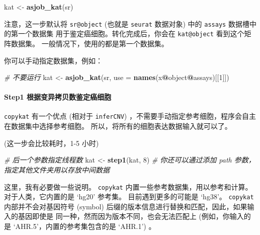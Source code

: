 \documentclass[
]{article}
\newenvironment{Shaded}{\begin{snugshade}}{\end{snugshade}}
\newcommand{\CommentTok}[1]{\textcolor[rgb]{0.56,0.35,0.01}{\textit{#1}}}
\newcommand{\DataTypeTok}[1]{\textcolor[rgb]{0.13,0.29,0.53}{#1}}
\newcommand{\DecValTok}[1]{\textcolor[rgb]{0.00,0.00,0.81}{#1}}
\newcommand{\KeywordTok}[1]{\textcolor[rgb]{0.13,0.29,0.53}{\textbf{#1}}}
\newcommand{\NormalTok}[1]{#1}
\newcommand{\OperatorTok}[1]{\textcolor[rgb]{0.81,0.36,0.00}{\textbf{#1}}}
\newcommand{\StringTok}[1]{\textcolor[rgb]{0.31,0.60,0.02}{#1}}
\begin{document}
\begin{Shaded}
\begin{Highlighting}[]
\NormalTok{kat \textless{}{-}}\StringTok{ }\KeywordTok{asjob\_kat}\NormalTok{(sr)}
\end{Highlighting}
\end{Shaded}

注意，这一步默认将 \texttt{sr@object} (也就是 \texttt{seurat} 数据对象) 中的 \texttt{assays} 数据槽中的第一个数据集
用于鉴定癌细胞。转化完成后，你会在 \texttt{kat@object} 看到这个矩阵数据集。
一般情况下，使用的都是第一个数据集。

你可以手动指定数据集，例如：

\begin{Shaded}
\begin{Highlighting}[]
\CommentTok{\# 不要运行}
\NormalTok{kat \textless{}{-}}\StringTok{ }\KeywordTok{asjob\_kat}\NormalTok{(sr, }\DataTypeTok{use =} \KeywordTok{names}\NormalTok{(x}\OperatorTok{@}\NormalTok{object}\OperatorTok{@}\NormalTok{assays)[[}\DecValTok{1}\NormalTok{]])}
\end{Highlighting}
\end{Shaded}

\hypertarget{step1-ux6839ux636eux53d8ux5f02ux62f7ux8d1dux6570ux9274ux5b9aux764cux7ec6ux80de}{%
\paragraph{Step1 根据变异拷贝数鉴定癌细胞}\label{step1-ux6839ux636eux53d8ux5f02ux62f7ux8d1dux6570ux9274ux5b9aux764cux7ec6ux80de}}

\texttt{copykat} 有一个优点 (相对于 \texttt{inferCNV}) ，不需要手动指定参考细胞，程序会自主在数据集中选择参考细胞。
所以，将所有的细胞表达数据输入就可以了。

(这一步会比较耗时，1-5 小时)

\begin{Shaded}
\begin{Highlighting}[]
\CommentTok{\# 后一个参数指定线程数}
\NormalTok{kat \textless{}{-}}\StringTok{ }\KeywordTok{step1}\NormalTok{(kat, }\DecValTok{8}\NormalTok{)}
\CommentTok{\# 你还可以通过添加 \textasciigrave{}path\textasciigrave{} 参数，指定其他文件夹用以存放中间数据}
\end{Highlighting}
\end{Shaded}

这里，我有必要做一些说明。
\texttt{copykat} 内置一些参考数据集，用以参考和计算。对于人类，它内置的是 `hg20' 参考集。
目前遇到更多的可能是 `hg38'。
\texttt{copykat} 内部并不会对基因符号 (symbol) 后缀的版本信息进行替换和匹配，因此，如果输入的基因即使是
同一种，然而因为版本不同，也会无法匹配上 (例如，你输入的是 `AHR.5'，内置的参考集包含的是 `AHR.1') 。
\end{document}
